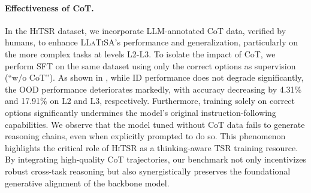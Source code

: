 \documentclass[11pt]{article}
\begin{document}
\paragraph{Effectiveness of CoT.}
In the \textsc{HiTSR} dataset, we incorporate LLM-annotated CoT data, verified by humans, to enhance \textsc{LLaTiSA}'s performance and generalization, particularly on the more complex tasks at levels L2-L3. To isolate the impact of CoT, we perform SFT on the same dataset using only the correct options as supervision (``w/o CoT''). As shown in , while ID performance does not degrade significantly, the OOD performance deteriorates markedly, with accuracy decreasing by 4.31\% and 17.91\% on L2 and L3, respectively. 
Furthermore, training solely on correct options significantly undermines the model's original instruction-following capabilities. We observe that the model tuned without CoT data fails to generate reasoning chains, even when explicitly prompted to do so. This phenomenon highlights the critical role of \textsc{HiTSR} as a thinking-aware TSR training resource. By integrating high-quality CoT trajectories, our benchmark not only incentivizes robust cross-task reasoning but also synergistically preserves the foundational generative alignment of the backbone model.

\begin{table}[tbp]
\centering
\setlength{\tabcolsep}{2pt}
\renewcommand{\arraystretch}{1.2}
\caption{Ablation results. ``w/o CoT'' denotes SFT on the same dataset using only the correct options as supervision during training on L2-L3, ``joint training'' performs a single-stage training regime.}
\label{tab:ablation}
\end{table}
\end{document}
